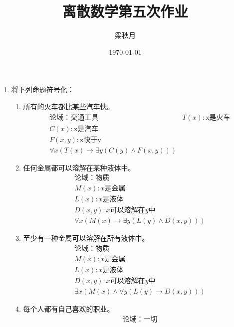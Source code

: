 \documentclass[UTF8]{ctexart}
\title{离散数学第五次作业}
\author{梁秋月}
\date{\today}
\begin{document}
   \maketitle
   \begin{enumerate}
       \item 将下列命题符号化：
       \begin{enumerate}
           \item 所有的火车都比某些汽车快。
            \[
                \begin{aligned}
                    &\text{论域：交通工具}
                    &T(x):\text{x是火车}\\
                    &C(x):\text{x是汽车}\\
                    &F(x,y):\text{x快于y}\\
                    &\forall x(T(x)\rightarrow \exists y(C(y)\wedge F(x,y)))
                \end{aligned}
            \]
           \item 任何金属都可以溶解在某种液体中。
           \[
               \begin{aligned}
                   &\text{论域：物质}\\
                   &M(x):\text{$x$是金属}\\
                   &L(x):\text{$x$是液体}\\
                   &D(x,y):\text{$x$可以溶解在$y$中}\\
                   &\forall x(M(x)\rightarrow \exists y(L(y)\wedge D(x,y)))
                \end{aligned}
           \]
           \item 至少有一种金属可以溶解在所有液体中。
           \[
               \begin{aligned}
                   &\text{论域：物质}\\
                   &M(x):\text{$x$是金属}\\
                   &L(x):\text{$x$是液体}\\
                   &D(x,y):\text{$x$可以溶解在$y$中}\\
                   &\exists x(M(x)\wedge \forall y(L(y)\rightarrow D(x,y)))
                \end{aligned}
           \]
           \item 每个人都有自己喜欢的职业。
           \[
               \begin{aligned}
                   &\text{论域：一切}\\

\end{aligned}\]
\end{enumerate}
\end{enumerate}
\end{document}
